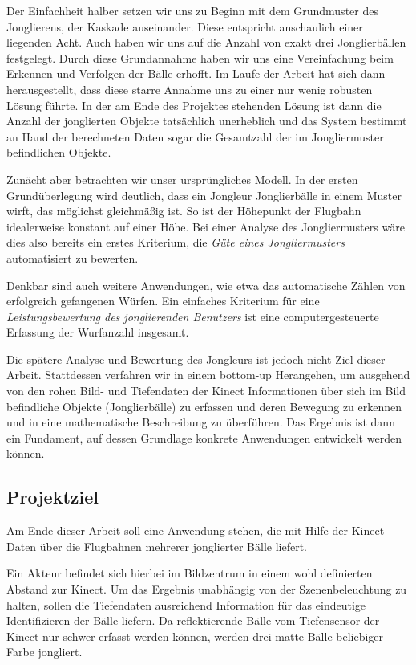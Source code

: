 \documentclass[12pt,a4paper,ngerman]{scrartcl}
\begin{document}
Der Einfachheit halber setzen wir uns zu Beginn mit dem Grundmuster des Jonglierens,
der Kaskade\cite{libraryjuggling} auseinander. Diese entspricht anschaulich einer liegenden Acht. Auch
haben wir uns auf die Anzahl von exakt drei Jonglierbällen festgelegt. Durch diese
Grundannahme haben wir uns eine Vereinfachung beim Erkennen und Verfolgen der Bälle
erhofft. Im Laufe der Arbeit hat sich dann herausgestellt, dass diese starre Annahme
uns zu einer nur wenig robusten Lösung führte. In der am Ende des Projektes
stehenden Lösung ist dann die Anzahl der jonglierten Objekte tatsächlich unerheblich
und das System bestimmt an Hand der berechneten Daten sogar die Gesamtzahl der
im Jongliermuster befindlichen Objekte.

Zunächt aber betrachten wir unser ursprüngliches Modell. In der ersten
Grundüberlegung wird deutlich, dass ein Jongleur Jonglierbälle
in einem Muster wirft, das möglichst gleichmäßig ist.
So ist der Höhepunkt der Flugbahn idealerweise konstant auf einer Höhe.
Bei einer Analyse des Jongliermusters wäre dies also bereits ein erstes Kriterium,
die \textit{Güte eines Jongliermusters} automatisiert zu bewerten.

Denkbar sind auch weitere Anwendungen, wie etwa das automatische Zählen von
erfolgreich gefangenen Würfen. Ein einfaches Kriterium für eine \textit{Leistungsbewertung des
jonglierenden Benutzers} ist eine computergesteuerte Erfassung der Wurfanzahl insgesamt.

Die spätere Analyse und Bewertung des Jongleurs ist jedoch nicht Ziel dieser Arbeit. Stattdessen verfahren wir
in einem bottom-up Herangehen, um ausgehend von den rohen Bild- und Tiefendaten der Kinect Informationen über sich im Bild befindliche Objekte (Jonglierbälle) zu erfassen und deren Bewegung zu erkennen und in eine mathematische Beschreibung zu überführen.
Das Ergebnis ist dann ein Fundament, auf dessen Grundlage konkrete Anwendungen entwickelt werden können.

\newpage

\subsection{Projektziel}

Am Ende dieser Arbeit soll eine Anwendung stehen, die mit Hilfe der Kinect Daten
über die Flugbahnen mehrerer jonglierter Bälle liefert.

Ein Akteur befindet sich hierbei im Bildzentrum in einem wohl definierten Abstand
zur Kinect. Um das Ergebnis unabhängig von der Szenenbeleuchtung zu halten, sollen die Tiefendaten ausreichend
Information für das eindeutige Identifizieren der Bälle liefern. Da reflektierende Bälle vom Tiefensensor der Kinect nur schwer erfasst werden können, werden drei matte Bälle beliebiger Farbe jongliert.
\end{document}
